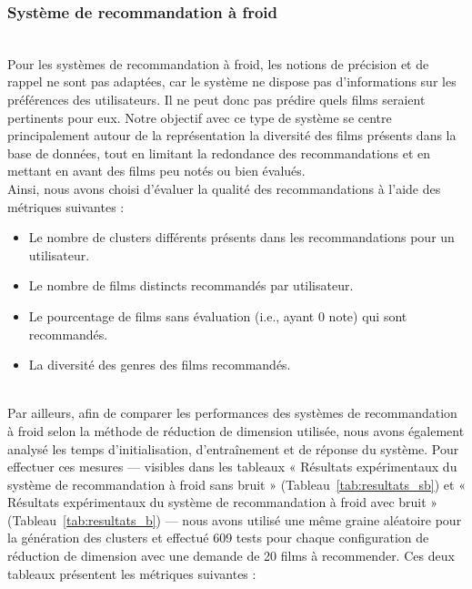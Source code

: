 \documentclass{article}
\begin{document}
    \subsubsection{Système de recommandation à froid}
    $ $\\
    Pour les systèmes de recommandation à froid, les notions de précision et de rappel ne sont pas adaptées, 
    car le système ne dispose pas d'informations sur les préférences des utilisateurs. Il ne peut donc pas 
    prédire quels films seraient pertinents pour eux. Notre objectif avec ce type de système se centre principalement 
    autour de la représentation la diversité des films présents dans la base de données, tout en limitant la 
    redondance des recommandations et en mettant en avant des films peu notés ou bien évalués.\\
    Ainsi, nous avons choisi d'évaluer la qualité des recommandations à l'aide des métriques suivantes :\\
    \begin{itemize}
        \item Le nombre de clusters différents présents dans les recommandations pour un utilisateur.
        \item Le nombre de films distincts recommandés par utilisateur.
        \item Le pourcentage de films sans évaluation (i.e., ayant 0 note) qui sont recommandés.
        \item La diversité des genres des films recommandés.
    \end{itemize}
    $ $\\
    Par ailleurs, afin de comparer les performances des systèmes de recommandation à froid selon la méthode de
    réduction de dimension utilisée, nous avons également analysé les temps d’initialisation, d’entraînement
    et de réponse du système. Pour effectuer ces mesures — visibles dans les tableaux « Résultats expérimentaux 
    du système de recommandation à froid sans bruit » (Tableau~\ref{tab:resultats_sb}) et « Résultats expérimentaux 
    du système de recommandation à froid avec bruit » (Tableau~\ref{tab:resultats_b}) — nous avons utilisé une même 
    graine aléatoire pour la génération des clusters et effectué 609 tests pour chaque configuration de réduction de dimension avec une demande de 20 films à recommender.
    Ces deux tableaux présentent les métriques suivantes :\\
\end{document}
